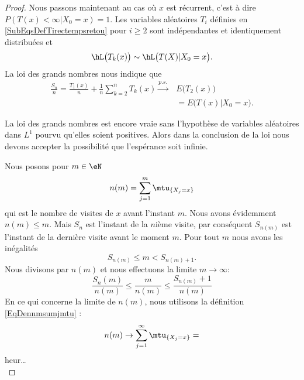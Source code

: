 \begin{proof}
    Nous passons maintenant au cas où \( x\) est récurrent, c'est à dire \( P(T(x)<\infty|X_0=x)=1\). Les variables aléatoires \( T_i\) définies en \eqref{SubEqsDefTirectempsretou} pour \( i\geq 2\) sont indépendantes et identiquement distribuées et
    \begin{equation}
        \hL\big( T_k(x) \big)\sim\hL\big( T(X)|X_0=x \big).
    \end{equation}
    La loi des grands nombres nous indique que
    \begin{subequations}        \label{EqlgnMarkdemked}
        \begin{align}
            \frac{ S_n }{ n }=\frac{ T_1(x) }{ n }+\frac{1}{ n }\sum_{k=2}^nT_k(x)\stackrel{p.s.}{\longrightarrow}& E\big( T_2(x) \big)\\
            &=E\big( T(x)|X_0=x \big).
        \end{align}
    \end{subequations}
    \begin{remark}
        La loi des grands nombres est encore vraie sans l'hypothèse de variables aléatoires dans \( L^1\) pourvu qu'elles soient positives. Alors dans la conclusion de la loi nous devons accepter la possibilité que l'espérance soit infinie.
    \end{remark}
    Nous posons pour \( m\in\eN\)
    \begin{equation}    \label{EqDennmsumjmtu}
        n(m)=\sum_{j=1}^m\mtu_{\{ X_j=x \}}
    \end{equation}
    qui est le nombre de visites de \( x\) avant l'instant \( m\). Nous avons évidemment \( n(m)\leq m\). Mais \( S_n\) est l'instant de la \( n\)ième visite, par conséquent \( S_{n(m)}\) est l'instant de la dernière visite avant le moment \( m\). Pour tout \( m\) nous avons les inégalités 
    \begin{equation}
        S_{n(m)}\leq m<S_{n(m)+1}.
    \end{equation}
    Nous divisons par \( n(m)\) et nous effectuons la limite \( m\to\infty\):
    \begin{equation}    \label{EqdrembSnm}
        \frac{ S_n(m) }{ n(m) }\leq \frac{ m }{ n(m) }\leq\frac{ S_{n(m)}+1 }{ n(m) }
    \end{equation}
    En ce qui concerne la limite de \( n(m)\), nous utilisons la définition \eqref{EqDennmsumjmtu} :
    \begin{equation}
        n(m)\to\sum_{j=1}^{\infty}\mtu_{\{ X_j=x \}}=
    \end{equation}
heur\ldots
     \begin{equation}

\end{equation}
\end{proof}
